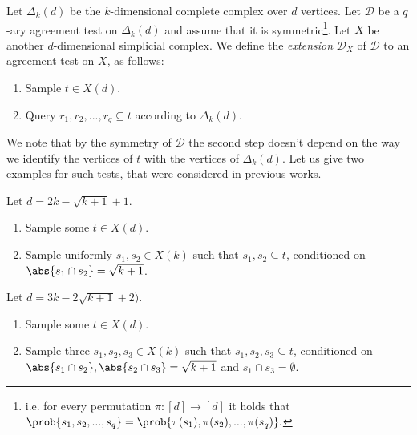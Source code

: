 Let \(\Delta_k(d)\) be the \(k\)-dimensional complete complex over \(d\) vertices. Let \(\mathcal{D}\) be a \(q\)-ary agreement test on \(\Delta_k(d)\) and assume that it is symmetric\footnote{i.e. for every permutation \(\pi:[d] \to [d]\) it holds that \(\prob{s_1,s_2,...,s_q} = \prob{\pi(s_1),\pi(s_2),...,\pi(s_q)}.\)}. Let \(X\) be another \(d\)-dimensional simplicial complex. We define the \emph{extension} \(\mathcal{D}_X\) of \(\mathcal{D}\) to an agreement test on \(X\), as follows:
\begin{enumerate}
    \item Sample \(t \in X(d)\).
    \item Query \(r_1,r_2,...,r_q \subseteq t\) according to \(\Delta_k(d)\).
\end{enumerate}
We note that by the symmetry of \(\mathcal{D}\) the second step doesn't depend on the way we identify the vertices of \(t\) with the vertices of \(\Delta_k(d)\). Let us give two examples for such tests, that were considered in previous works. %
\begin{definition}
    Let \(d = 2k-\sqrt{k+1}+1\).
    \begin{enumerate}
        \item Sample some \(t \in X(d)\).
        \item Sample uniformly \(s_1,s_2 \in X(k)\) such that \(s_1, s_2 \subseteq t\), conditioned on \(\abs{s_1 \cap s_2} = \sqrt{k+1}\).
    \end{enumerate}
\end{definition}

\begin{definition}
    Let \(d=3k-2\sqrt{k+1}+2)\).
    \begin{enumerate}
        \item Sample some \(t \in X(d)\).
        \item Sample three \(s_1,s_2,s_3 \in X(k)\) such that \(s_1, s_2, s_3 \subseteq t\), conditioned on \(\abs{s_1 \cap s_2}, \abs{s_2 \cap s_3} = \sqrt{k+1}\) and \(s_1 \cap s_3 = \emptyset\).
    \end{enumerate}
\end{definition}

